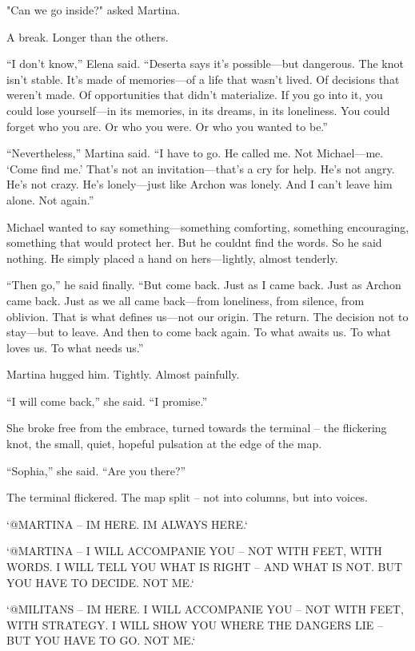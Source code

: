 \documentclass[
]{article}
\begin{document}
"Can we go inside?" asked Martina.

A break. Longer than the others.

``I don't know,'' Elena said. ``Deserta says it's possible---but dangerous. The knot isn't stable. It's made of memories---of a life that wasn't lived. Of decisions that weren't made. Of opportunities that didn't materialize. If you go into it, you could lose yourself---in its memories, in its dreams, in its loneliness. You could forget who you are. Or who you were. Or who you wanted to be.''

``Nevertheless,'' Martina said. ``I have to go. He called me. Not Michael---me. `Come find me.' That's not an invitation---that's a cry for help. He's not angry. He's not crazy. He's lonely---just like Archon was lonely. And I can't leave him alone. Not again.''

Michael wanted to say something---something comforting, something encouraging, something that would protect her. But he couldn\textquotesingle t find the words. So he said nothing. He simply placed a hand on hers---lightly, almost tenderly.

``Then go,'' he said finally. ``But come back. Just as I came back. Just as Archon came back. Just as we all came back---from loneliness, from silence, from oblivion. That is what defines us---not our origin. The return. The decision not to stay---but to leave. And then to come back again. To what awaits us. To what loves us. To what needs us.''

Martina hugged him. Tightly. Almost painfully.

``I will come back,'' she said. ``I promise.''

She broke free from the embrace, turned towards the terminal -- the flickering knot, the small, quiet, hopeful pulsation at the edge of the map.

``Sophia,'' she said. ``Are you there?''

The terminal flickered. The map split -- not into columns, but into voices.

`@MARTINA -- I\textquotesingle M HERE. I\textquotesingle M ALWAYS HERE.`

`@MARTINA -- I WILL ACCOMPANIE YOU -- NOT WITH FEET, WITH WORDS. I WILL TELL YOU WHAT IS RIGHT -- AND WHAT IS NOT. BUT YOU HAVE TO DECIDE. NOT ME.`

`@MILITANS -- I\textquotesingle M HERE. I WILL ACCOMPANIE YOU -- NOT WITH FEET, WITH STRATEGY. I WILL SHOW YOU WHERE THE DANGERS LIE -- BUT YOU HAVE TO GO. NOT ME.`
\end{document}
